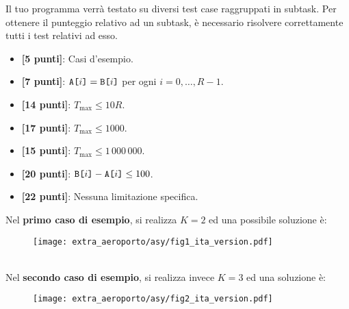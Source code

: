 

\Scoring

Il tuo programma verrà testato su diversi test case raggruppati in subtask.
Per ottenere il punteggio relativo ad un subtask, è necessario risolvere correttamente tutti i test relativi ad esso.

\begin{itemize}[nolistsep,itemsep=2mm]
  \item \textbf{ [\phantom{0}5 punti]}: Casi d'esempio.
  \item \textbf{ [\phantom{0}7 punti]}: $\text{\texttt{A[$i$]}} = \text{\texttt{B[$i$]}}$ per ogni $i=0,\ldots, R-1$.
  \item \textbf{ [14 punti]}: $T_{\text{max}} \leq 10 R$.
  \item \textbf{ [17 punti]}: $T_{\text{max}} \leq 1000$.
  \item \textbf{ [15 punti]}: $T_{\text{max}} \leq 1\,000\,000$.
  \item \textbf{ [20 punti]}: $\text{\texttt{B[$i$]}} - \text{\texttt{A[$i$]}} \leq 100$.
  \item \textbf{ [22 punti]}: Nessuna limitazione specifica.
\end{itemize}



\Examples

\begin{example}
%
%
\end{example}



\Explanation

Nel \textbf{primo caso di esempio}, si realizza $K=2$ ed una possibile soluzione \`e:
	\begin{figure}[H]
	\centering\texttt{[image: extra\_aeroporto/asy/fig1\_ita\_version.pdf]}
	\end{figure}\\[2mm]

Nel \textbf{secondo caso di esempio}, si realizza invece $K=3$ ed una soluzione \`e:
	\begin{figure}[H]
	\centering\texttt{[image: extra\_aeroporto/asy/fig2\_ita\_version.pdf]}
	\end{figure}
